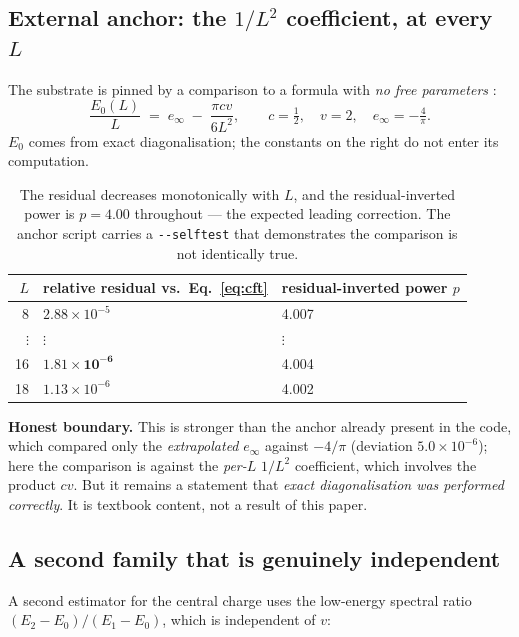\documentclass[11pt,a4paper]{article}
\newcommand{\code}[1]{\texttt{\small #1}}
\begin{document}
\subsection{External anchor: the $1/L^2$ coefficient, at every $L$}
\label{sec:anchor}

The substrate is pinned by a comparison to a formula with \emph{no free parameters} \cite{CalabreseCardy2004}:
\begin{equation}
  \frac{E_0(L)}{L} \;=\; e_\infty \;-\; \frac{\pi c v}{6 L^2},
  \qquad c = \tfrac12,\quad v = 2,\quad e_\infty = -\tfrac{4}{\pi}.
  \label{eq:cft}
\end{equation}
$E_0$ comes from exact diagonalisation; the constants on the right do not enter its
computation.

\begin{table}[h]
\centering\small
\begin{tabular}{@{}rll@{}}
\toprule
$L$ & relative residual vs.\ Eq.~\eqref{eq:cft} & residual-inverted power $p$ \\
\midrule
8  & $2.88\times10^{-5}$ & 4.007 \\
$\vdots$ & $\vdots$ & $\vdots$ \\
16 & $\mathbf{1.81\times10^{-6}}$ & 4.004 \\
18 & $1.13\times10^{-6}$ & 4.002 \\
\bottomrule
\end{tabular}
\caption{The residual decreases monotonically with $L$, and the residual-inverted
power is $p = 4.00$ throughout --- the expected leading correction. The anchor
script carries a \code{-{}-selftest} that demonstrates the comparison is not
identically true.}
\label{tab:anchor}
\end{table}

\noindent\textbf{Honest boundary.} This is stronger than the anchor already present
in the code, which compared only the \emph{extrapolated} $e_\infty$ against
$-4/\pi$ (deviation $5.0\times10^{-6}$); here the comparison is against the
\emph{per-$L$} $1/L^2$ coefficient, which involves the product $cv$. But it remains
a statement that \emph{exact diagonalisation was performed correctly}. It is
textbook content, not a result of this paper.

\subsection{A second family that is genuinely independent}
\label{sec:secondfamily}

A second estimator for the central charge uses the low-energy spectral ratio
$(E_2 - E_0)/(E_1 - E_0)$, which is independent of $v$:
\end{document}
